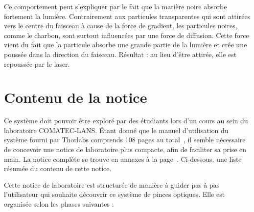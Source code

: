Ce comportement peut s'expliquer par le fait que la matière noire absorbe fortement la lumière. Contrairement aux particules transparentes qui sont attirées vers le centre du faisceau à cause de la force de gradient, les particules noires, comme le charbon, sont surtout influencées par une force de diffusion. Cette force vient du fait que la particule absorbe une grande partie de la lumière et crée une poussée dans la direction du faisceau. Résultat : au lieu d'être attirée, elle est repoussée par le laser.

\newpage
\section{Contenu de la notice}
Ce système doit pouvoir être exploré par des étudiants lors d'un cours au sein du laboratoire COMATEC-LANS. Étant donné que le manuel d'utilisation du système fourni par Thorlabs comprends 108 pages au total~\cite{manualPortableOpticalTweezers}, il semble nécessaire de concevoir une notice de laboratoire plus compacte, afin de faciliter sa prise en main. La notice complète se trouve en annexes à la page~\pageref{annexe:notice_labo}. Ci-dessous, une liste résumée du contenu de cette notice.

Cette notice de laboratoire est structurée de manière à guider pas à pas l'utilisateur qui souhaite découvrir ce système de pinces optiques.
Elle est organisée selon les phases suivantes :

